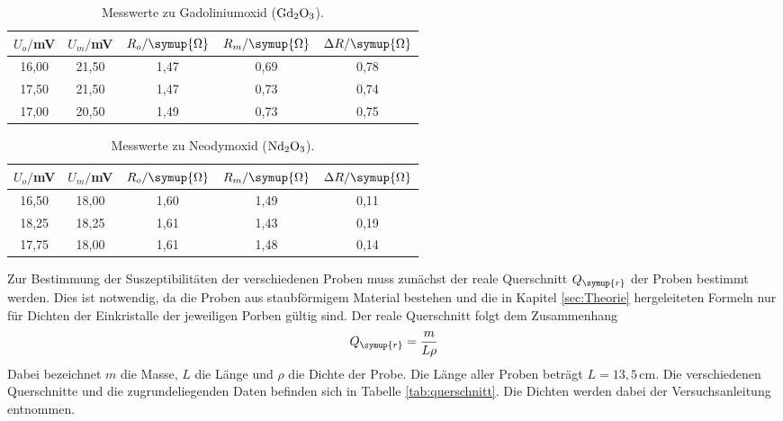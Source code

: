 \begin{table}[htp]
	\begin{center}
    \caption{Messwerte zu Gadoliniumoxid ($\ce{Gd2O3}$).}
    \label{tab:gadolinium}
		\begin{tabular}{ccccc}
		\toprule
			{$U_o/$mV} & {$U_m/$mV} & {$R_o/\symup{\Omega}$} & {$R_m/\symup{\Omega}$} & {$\Delta R/\symup{\Omega}$}\\
			\midrule
			16,00 & 21,50 & 1,47 & 0,69 & 0,78\\
			17,50 & 21,50 & 1,47 & 0,73 & 0,74\\
			17,00 & 20,50 & 1,49 & 0,73 & 0,75\\
		\bottomrule
		\end{tabular}
	\end{center}
\end{table}



\begin{table}[htp]
	\begin{center}
    \caption{Messwerte zu Neodymoxid ($\ce{Nd2O3}$).}
    \label{tab:neodym}
		\begin{tabular}{ccccc}
		\toprule
			{$U_o/$mV} & {$U_m/$mV} & {$R_o/\symup{\Omega}$} & {$R_m/\symup{\Omega}$} & {$\Delta R/\symup{\Omega}$}\\
			\midrule
			16,50 & 18,00 & 1,60 & 1,49 & 0,11\\
			18,25 & 18,25 & 1,61 & 1,43 & 0,19\\
			17,75 & 18,00 & 1,61 & 1,48 & 0,14\\
		\bottomrule
		\end{tabular}
	\end{center}
\end{table}


Zur Bestimmung der Suszeptibilitäten der verschiedenen Proben muss zunächst
der reale Querschnitt $Q_{\symup{r}}$ der Proben bestimmt werden. Dies ist notwendig,
da die Proben aus staubförmigem Material bestehen und die in Kapitel \ref{sec:Theorie}
hergeleiteten Formeln nur für Dichten der Einkristalle der jeweiligen Porben
gültig sind. Der reale Querschnitt folgt dem Zusammenhang
\begin{align}
  Q_{\symup{r}}=\frac{m}{L\rho}
\end{align}
Dabei bezeichnet $m$ die Masse, $L$ die Länge und $\rho$ die Dichte der Probe. Die
Länge aller Proben beträgt $L=13,5\,$cm. Die verschiedenen Querschnitte und die zugrundeliegenden
Daten befinden sich in Tabelle \ref{tab:querschnitt}. Die Dichten werden dabei der
Versuchsanleitung \cite{Versuchsanleitung} entnommen.

